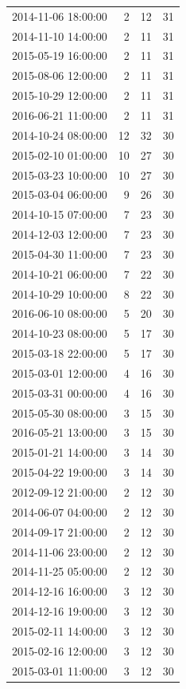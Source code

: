 \begin{tabular}{lrrr}
2014-11-06 18:00:00 & 2 & 12 & 31 \\
2014-11-10 14:00:00 & 2 & 11 & 31 \\
2015-05-19 16:00:00 & 2 & 11 & 31 \\
2015-08-06 12:00:00 & 2 & 11 & 31 \\
2015-10-29 12:00:00 & 2 & 11 & 31 \\
2016-06-21 11:00:00 & 2 & 11 & 31 \\
2014-10-24 08:00:00 & 12 & 32 & 30 \\
2015-02-10 01:00:00 & 10 & 27 & 30 \\
2015-03-23 10:00:00 & 10 & 27 & 30 \\
2015-03-04 06:00:00 & 9 & 26 & 30 \\
2014-10-15 07:00:00 & 7 & 23 & 30 \\
2014-12-03 12:00:00 & 7 & 23 & 30 \\
2015-04-30 11:00:00 & 7 & 23 & 30 \\
2014-10-21 06:00:00 & 7 & 22 & 30 \\
2014-10-29 10:00:00 & 8 & 22 & 30 \\
2016-06-10 08:00:00 & 5 & 20 & 30 \\
2014-10-23 08:00:00 & 5 & 17 & 30 \\
2015-03-18 22:00:00 & 5 & 17 & 30 \\
2015-03-01 12:00:00 & 4 & 16 & 30 \\
2015-03-31 00:00:00 & 4 & 16 & 30 \\
2015-05-30 08:00:00 & 3 & 15 & 30 \\
2016-05-21 13:00:00 & 3 & 15 & 30 \\
2015-01-21 14:00:00 & 3 & 14 & 30 \\
2015-04-22 19:00:00 & 3 & 14 & 30 \\
2012-09-12 21:00:00 & 2 & 12 & 30 \\
2014-06-07 04:00:00 & 2 & 12 & 30 \\
2014-09-17 21:00:00 & 2 & 12 & 30 \\
2014-11-06 23:00:00 & 2 & 12 & 30 \\
2014-11-25 05:00:00 & 2 & 12 & 30 \\
2014-12-16 16:00:00 & 3 & 12 & 30 \\
2014-12-16 19:00:00 & 3 & 12 & 30 \\
2015-02-11 14:00:00 & 3 & 12 & 30 \\
2015-02-16 12:00:00 & 3 & 12 & 30 \\
2015-03-01 11:00:00 & 3 & 12 & 30 \\

\end{tabular}
